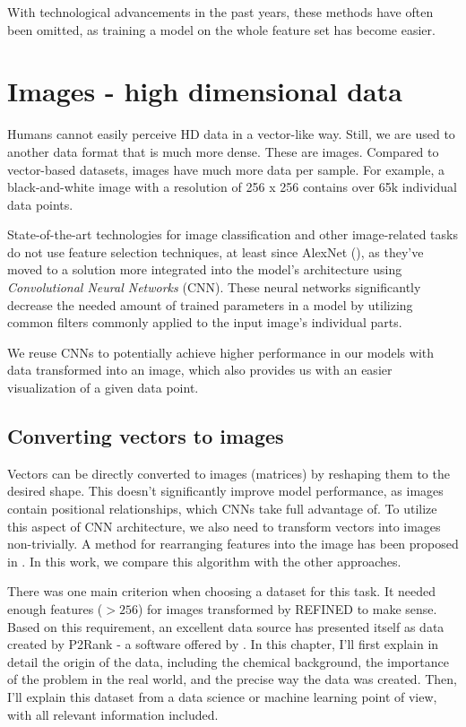 With technological advancements in the past years, these methods have often been omitted, as training a model on the whole feature set has become easier.

\section{Images - high dimensional data}
Humans cannot easily perceive HD data in a vector-like way. Still, we are used to another data format that is much more dense. These are images. Compared to vector-based datasets, images have much more data per sample. For example, a black-and-white image with a resolution of 256 x 256 contains over 65k individual data points. 

State-of-the-art technologies for image classification and other image-related tasks do not use feature selection techniques, at least since AlexNet (\cite{AlexNet}), as they've moved to a solution more integrated into the model's architecture using \textit{Convolutional Neural Networks} (CNN). These neural networks significantly decrease the needed amount of trained parameters in a model by utilizing common filters commonly applied to the input image's individual parts.

We reuse CNNs to potentially achieve higher performance in our models with data transformed into an image, which also provides us with an easier visualization of a given data point. 

\subsection{Converting vectors to images}
Vectors can be directly converted to images (matrices) by reshaping them to the desired shape. This doesn't significantly improve model performance, as images contain positional relationships, which CNNs take full advantage of. To utilize this aspect of CNN architecture, we also need to transform vectors into images non-trivially. 
A method for rearranging features into the image has been proposed in \cite{REFINED}. In this work, we compare this algorithm with the other approaches.

There was one main criterion when choosing a dataset for this task. It needed enough features ($> 256$) for images transformed by REFINED to make sense. Based on this requirement, an excellent data source has presented itself as data created by P2Rank - a software offered by \cite{P2RANK}. In this chapter, I'll first explain in detail the origin of the data, including the chemical background, the importance of the problem in the real world, and the precise way the data was created. Then, I'll explain this dataset from a data science or machine learning point of view, with all relevant information included. 

